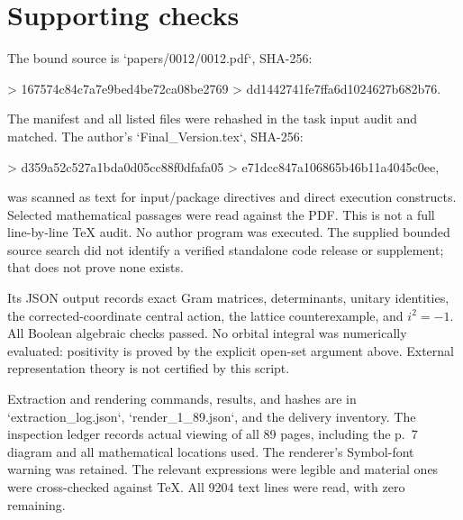 \documentclass[10pt]{article}
\begin{document}
\section*{Supporting checks}
The bound source is `papers/0012/0012.pdf`, SHA-256:\par
> 167574c84c7a7e9bed4be72ca08be2769
> dd1442741fe7ffa6d1024627b682b76.\par
The manifest and all listed files were rehashed in the task input audit and matched. The author’s `Final\_Version.tex`, SHA-256:\par
> d359a52c527a1bda0d05cc88f0dfafa05
> e71dcc847a106865b46b11a4045c0ee,\par
was scanned as text for input/package directives and direct execution constructs. Selected mathematical passages were read against the PDF. This is not a full line-by-line TeX audit. No author program was executed. The supplied bounded source search did not identify a verified standalone code release or supplement; that does not prove none exists.\par
Its JSON output records exact Gram matrices, determinants, unitary identities, the corrected-coordinate central action, the lattice counterexample, and \(i^2=-1\). All Boolean algebraic checks passed. No orbital integral was numerically evaluated: positivity is proved by the explicit open-set argument above. External representation theory is not certified by this script.\par
Extraction and rendering commands, results, and hashes are in `extraction\_log.json`, `render\_1\_89.json`, and the delivery inventory. The inspection ledger records actual viewing of all 89 pages, including the p. 7 diagram and all mathematical locations used. The renderer’s Symbol-font warning was retained. The relevant expressions were legible and material ones were cross-checked against TeX. All 9204 text lines were read, with zero remaining.\par
\end{document}
